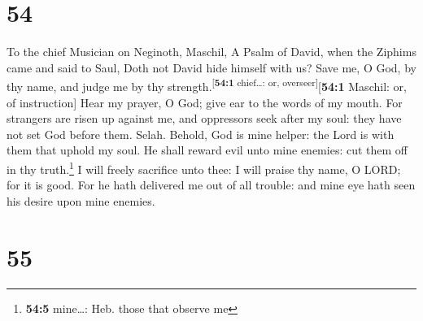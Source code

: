 \hypertarget{section-53}{%
\section{54}\label{section-53}}

To the chief Musician on Neginoth, Maschil, A Psalm of David, when the
Ziphims came and said to Saul, Doth not David hide himself with us?
 Save me, O God, by thy name, and judge me by thy
strength.\textsuperscript{{[}\textbf{54:1} chief\ldots: or,
overseer{]}}{[}\textbf{54:1} Maschil: or, of instruction{]}
 Hear my prayer, O God; give ear to the words of my mouth.
 For strangers are risen up against me, and oppressors
seek after my soul: they have not set God before them. Selah.
 Behold, God is mine helper: the Lord is with them that
uphold my soul.  He shall reward evil unto mine enemies:
cut them off in thy truth.\footnote{\textbf{54:5} mine\ldots: Heb. those
  that observe me}  I will freely sacrifice unto thee: I
will praise thy name, O LORD; for it is good.  For he hath
delivered me out of all trouble: and mine eye hath seen his desire upon
mine enemies.

\hypertarget{section-54}{%
\section{55}\label{section-54}}


